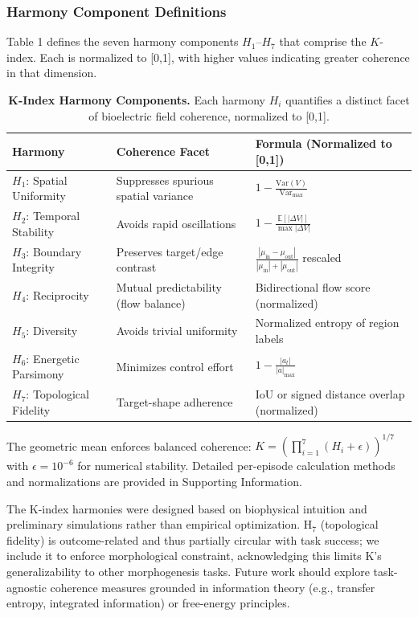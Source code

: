 \documentclass[10pt,letterpaper]{article}
\begin{document}
\subsubsection*{Harmony Component Definitions}

Table 1 defines the seven harmony components $H_1$–$H_7$ that comprise the $K$-index. Each is normalized to [0,1], with higher values indicating greater coherence in that dimension.

\begin{table}[h]
\caption{\textbf{K-Index Harmony Components.} Each harmony $H_i$ quantifies a distinct facet of bioelectric field coherence, normalized to [0,1].}
\begin{tabular}{lp{5cm}p{6cm}}
\hline
\textbf{Harmony} & \textbf{Coherence Facet} & \textbf{Formula (Normalized to [0,1])} \\
\hline
$H_1$: Spatial Uniformity & Suppresses spurious spatial variance & $1 - \frac{\text{Var}(V)}{\text{Var}_{\max}}$ \\
$H_2$: Temporal Stability & Avoids rapid oscillations & $1 - \frac{\mathbb{E}[|\Delta V|]}{\max|\Delta V|}$ \\
$H_3$: Boundary Integrity & Preserves target/edge contrast & $\frac{|\mu_{\text{in}} - \mu_{\text{out}}|}{|\mu_{\text{in}}| + |\mu_{\text{out}}|}$ rescaled \\
$H_4$: Reciprocity & Mutual predictability (flow balance) & Bidirectional flow score (normalized) \\
$H_5$: Diversity & Avoids trivial uniformity & Normalized entropy of region labels \\
$H_6$: Energetic Parsimony & Minimizes control effort & $1 - \frac{|a_t|}{|a|_{\max}}$ \\
$H_7$: Topological Fidelity & Target-shape adherence & IoU or signed distance overlap (normalized) \\
\hline
\end{tabular}
\label{tab:harmonies}
\end{table}

The geometric mean enforces balanced coherence: $K = \left(\prod_{i=1}^{7} (H_i + \epsilon)\right)^{1/7}$ with $\epsilon = 10^{-6}$ for numerical stability. Detailed per-episode calculation methods and normalizations are provided in Supporting Information.

The K-index harmonies were designed based on biophysical intuition and preliminary simulations rather than empirical optimization. H$_7$ (topological fidelity) is outcome-related and thus partially circular with task success; we include it to enforce morphological constraint, acknowledging this limits K's generalizability to other morphogenesis tasks. Future work should explore task-agnostic coherence measures grounded in information theory (e.g., transfer entropy, integrated information) or free-energy principles.
\end{document}
